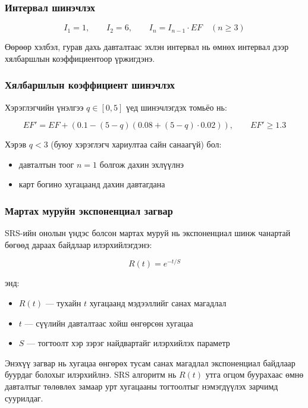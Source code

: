 \subsubsection*{Интервал шинэчлэх}

\[
I_1 = 1, \qquad I_2 = 6, \qquad I_n = I_{n-1} \cdot EF \quad (n \ge 3)
\]

Өөрөөр хэлбэл, гурав дахь давталтаас эхлэн интервал нь өмнөх интервал дээр хялбаршлын коэффициентоор үржигдэнэ.

\subsubsection*{Хялбаршлын коэффициент шинэчлэх}

Хэрэглэгчийн үнэлгээ $q \in [0,5]$ үед шинэчлэгдэх томьёо нь:

\[
EF' = EF + \left(0.1 - (5 - q)\left(0.08 + (5 - q)\cdot 0.02\right)\right), \qquad EF' \ge 1.3
\]

Хэрэв $q < 3$ (буюу хэрэглэгч хариултаа сайн санаагүй) бол:

\begin{itemize}[leftmargin=2em, itemsep=0.2em]
    \item давталтын тоог $n = 1$ болгож дахин эхлүүлнэ
    \item карт богино хугацаанд дахин давтагдана
\end{itemize}

\subsubsection*{Мартах муруйн экспоненциал загвар}

SRS-ийн онолын үндэс болсон мартах муруй нь экспоненциал шинж чанартай бөгөөд дараах байдлаар илэрхийлэгдэнэ:

\[
R(t) = e^{-t/S}
\]

энд:

\begin{itemize}[leftmargin=2em, itemsep=0.2em]
    \item $R(t)$ — тухайн $t$ хугацаанд мэдээллийг санах магадлал
    \item $t$ — сүүлийн давталтаас хойш өнгөрсөн хугацаа
    \item $S$ — тогтоолт хэр зэрэг найдвартайг илэрхийлэх параметр
\end{itemize}

Энэхүү загвар нь хугацаа өнгөрөх тусам санах магадлал экспоненциал байдлаар буурдаг болохыг илэрхийлнэ. SRS алгоритм нь $R(t)$ утга огцом буурахаас өмнө давталтыг төлөвлөх замаар урт хугацааны тогтоолтыг нэмэгдүүлэх зарчимд суурилдаг.


